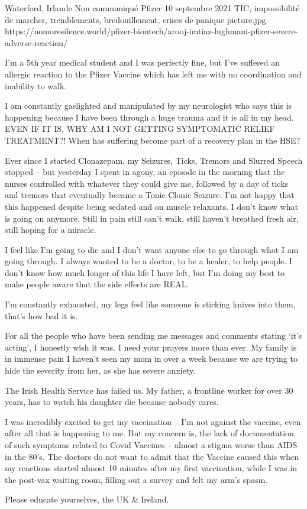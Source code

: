           {Waterford, Irlande}
          {Non communiqué}
          {Pfizer}
          {10 septembre 2021}
          {TIC, impossibilité de marcher, tremblements, bredouillement, crises de panique}
          {picture.jpg}
          {https://nomoresilence.world/pfizer-biontech/arooj-imtiaz-lughmani-pfizer-severe-adverse-reaction/}
          {
            
I’m a 5th year medical student and I was perfectly fine, but I’ve suffered an
allergic reaction to the Pfizer Vaccine which has left me with no coordination
and inability to walk.

I am constantly gaslighted and manipulated by my neurologist who says this is
happening because I have been through a huge trauma and it is all in my
head. EVEN IF IT IS, WHY AM I NOT GETTING SYMPTOMATIC RELIEF TREATMENT?! When
has suffering become part of a recovery plan in the HSE?

Ever since I started Clonazepam, my Seizures, Ticks, Tremors and Slurred Speech
stopped – but yesterday I spent in agony, an episode in the morning that the
nurses controlled with whatever they could give me, followed by a day of ticks
and tremors that eventually became a Tonic Clonic Seizure. I’m not happy that
this happened despite being sedated and on muscle relaxants. I don’t know what
is going on anymore. Still in pain still can’t walk, still haven’t breathed
fresh air, still hoping for a miracle.

I feel like I’m going to die and I don’t want anyone else to go through what I
am going through. I always wanted to be a doctor, to be a healer, to help
people. I don’t know how much longer of this life I have left, but I’m doing my
best to make people aware that the side effects are REAL.

I’m constantly exhausted, my legs feel like someone is sticking knives into
them, that’s how bad it is.

For all the people who have been sending me messages and comments stating ‘it’s
acting’, I honestly wish it was. I need your prayers more than ever. My family
is in immense pain I haven’t seen my mom in over a week because we are trying to
hide the severity from her, as she has severe anxiety.

The Irish Health Service has failed us. My father, a frontline worker for over
30 years, has to watch his daughter die because nobody cares.

I was incredibly excited to get my vaccination – I’m not against the vaccine,
even after all that is happening to me. But my concern is, the lack of
documentation of such symptoms related to Covid Vaccines – almost a stigma worse
than AIDS in the 80’s. The doctors do not want to admit that the Vaccine caused
this when my reactions started almost 10 minutes after my first vaccination,
while I was in the post-vax waiting room, filling out a survey and felt my arm’s
spasm.

Please educate yourselves, the UK \& Ireland.

}
